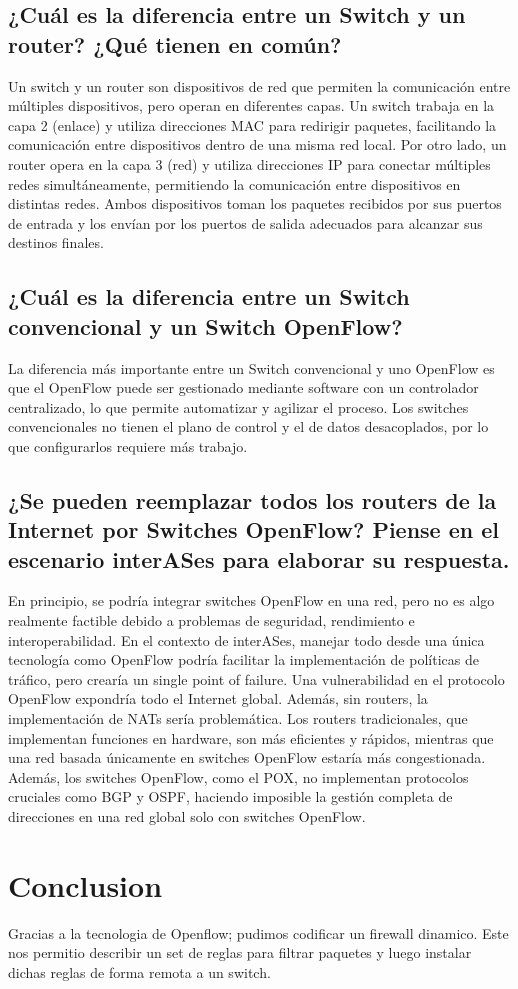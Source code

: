 \documentclass{article}
\begin{document}
\subsection{¿Cuál es la diferencia entre un Switch y un router? ¿Qué tienen en común?}
Un switch y un router son dispositivos de red que permiten la comunicación entre múltiples dispositivos, pero operan en diferentes capas. Un switch trabaja en la capa 2 (enlace) y utiliza direcciones MAC para redirigir paquetes, facilitando la comunicación entre dispositivos dentro de una misma red local. Por otro lado, un router opera en la capa 3 (red) y utiliza direcciones IP para conectar múltiples redes simultáneamente, permitiendo la comunicación entre dispositivos en distintas redes. Ambos dispositivos toman los paquetes recibidos por sus puertos de entrada y los envían por los puertos de salida adecuados para alcanzar sus destinos finales.


\subsection{¿Cuál es la diferencia entre un Switch convencional y un Switch OpenFlow?}
La diferencia más importante entre un Switch convencional y uno OpenFlow es que el OpenFlow puede ser gestionado mediante software con un controlador centralizado, lo que permite automatizar y agilizar el proceso. Los switches convencionales no tienen el plano de control y el de datos desacoplados, por lo que configurarlos requiere más trabajo.


\subsection{¿Se pueden reemplazar todos los routers de la Internet por Switches OpenFlow? Piense en el escenario interASes para elaborar su respuesta.}
En principio, se podría integrar switches OpenFlow en una red, pero no es algo realmente factible debido a problemas de seguridad, rendimiento e interoperabilidad. En el contexto de interASes, manejar todo desde una única tecnología como OpenFlow podría facilitar la implementación de políticas de tráfico, pero crearía un single point of failure. Una vulnerabilidad en el protocolo OpenFlow expondría todo el Internet global. Además, sin routers, la implementación de NATs sería problemática. Los routers tradicionales, que implementan funciones en hardware, son más eficientes y rápidos, mientras que una red basada únicamente en switches OpenFlow estaría más congestionada. Además, los switches OpenFlow, como el POX, no implementan protocolos cruciales como BGP y OSPF, haciendo imposible la gestión completa de direcciones en una red global solo con switches OpenFlow.


\section{Conclusion}
Gracias a la tecnologia de Openflow; pudimos codificar un firewall dinamico. Este nos permitio describir un set de reglas para filtrar paquetes y luego instalar dichas reglas de forma remota a un switch.
\end{document}
